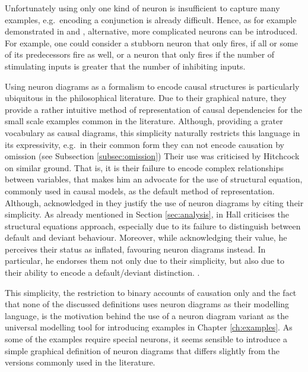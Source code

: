 \documentclass[11pt,a4paper]{book}
\theoremstyle{definition}
\theoremstyle{definition}
\theoremstyle{definition}
\theoremstyle{remark}
\begin{document}
Unfortunately using only one kind of neuron is insufficient to capture many examples, e.g.\ encoding a conjunction is already difficult.
Hence, as for example demonstrated in \cite{hitchcock2009structural} and \cite{baumgartner2013regularity}, alternative, more complicated neurons can be introduced. For example, one could consider a stubborn neuron that only fires, if all or some of its predecessors fire as well, or a neuron that only fires if the number of stimulating inputs is greater that the number of inhibiting inputs.

Using neuron diagrams as a formalism to encode causal structures is particularly ubiquitous in the philosophical literature. 
Due to their graphical nature, they provide a rather intuitive method of representation of causal dependencies for the small scale examples common in the literature.
Although, providing a grater vocabulary as causal diagrams, this simplicity naturally restricts this language in its expressivity, e.g.\ in their common form they can not encode causation by omission (see Subsection \ref{subsec:omission})
Their use was criticised by Hitchcock \cite{hitchcock2009structural} on similar ground. That is, it is their failure to encode complex relationships between variables, that makes him an advocate for the use of structural equation, commonly used in causal models, as the default method of representation. Although, acknowledged in \cite{erwig2010causal} they justify the use of neuron diagrams by citing their simplicity. 
As already mentioned in Section \ref{sec:analysis}, in \parencite{hall2007structural} Hall criticises the structural equations approach, especially due to its failure to distinguish between default and deviant behaviour. Moreover, while acknowledging their value, he perceives their status as inflated, favouring neuron diagrams instead. In particular, he endorses them not only due to their simplicity, but also due to their ability to encode a default/deviant distinction.
\parencite{baumgartner2013regularity,erwig2010causal,beckers2016general}.  

This simplicity, the restriction to binary accounts of causation only and the fact that none of the discussed definitions uses neuron diagrams as their modelling language, is the motivation behind the use of a neuron diagram variant as the universal modelling tool for introducing examples in Chapter \ref{ch:examples}. As some of the examples require special neurons, it seems sensible to introduce a simple graphical definition of neuron diagrams that differs slightly from the versions commonly used in the literature. 
\end{document}
